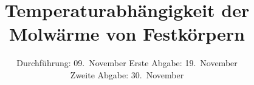 ﻿

\subject{Fortgeschrittenen Praktikum WS 15/16 - V47}
\title{Temperaturabhängigkeit der Molwärme von
Festkörpern}

\date{
	Durchführung: 09.~November 
	Erste Abgabe: 19.~November\\
	Zweite Abgabe: 30.~November
}



\maketitle
\thispagestyle{empty}
\tableofcontents
\newpage






\nocite{uncertainties}
\nocite{numpy}
\nocite{scipy}
\nocite{matplotlib}
\printbibliography

